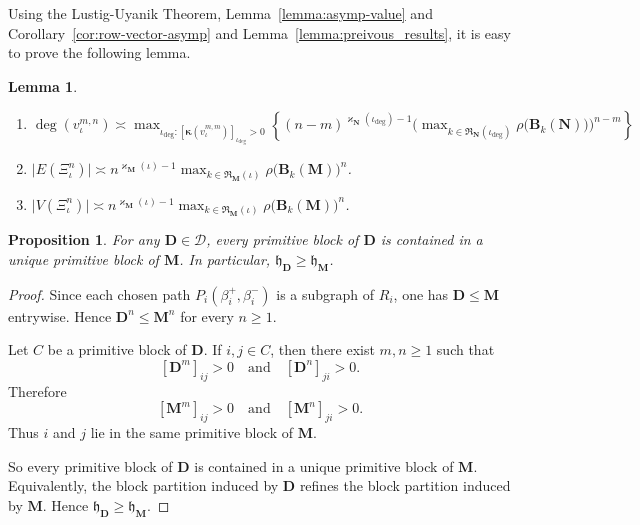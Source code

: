 \documentclass[12pt]{iopart}
\newtheorem{lemma}[theorem]{Lemma}
\newtheorem{proposition}[theorem]{Proposition}
\newcommand*{\bkappa}{\boldsymbol{\kappa}}
\begin{document}
Using the Lustig-Uyanik Theorem, Lemma~\ref{lemma:asymp-value} and Corollary~\ref{cor:row-vector-asymp} and Lemma~\ref{lemma:preivous_results}, 
it is easy to prove the following lemma.




\begin{lemma}\label{lem:basic-properties}$ $
\begin{enumerate}
    \item $\displaystyle
    \deg(v_\iota^{m,n})
\asymp
\max_{\iota_{\deg}:[\bkappa(v_\iota^{m,m})]_{\iota_{\deg}}>0}
\left\{
(n-m)^{\varkappa_{\mathbf N}(\iota_{\deg})-1}
\Big(
\max_{k\in\mathfrak R_{\mathbf N}(\iota_{\deg})}
\rho\big(\mathbf B_k(\mathbf N)\big)
\Big)^{n-m}
\right\}$
    \item 
    $\displaystyle
    \big|E(\Xi_{\iota}^n)\big|
    \asymp  
    n^{\varkappa_{\mathbf{M}}(\iota)-1}\max_{k\in\mathfrak{R}_{\mathbf M}(\iota)} 
    \rho \big( \mathbf{B}_k (\mathbf{M}) \big)^n
    $.
    \item 
    $\displaystyle
    \big|V(\Xi_{\iota}^n)\big|
    \asymp  
    n^{\varkappa_{\mathbf{M}}(\iota)-1}\max_{k\in\mathfrak{R}_{\mathbf M}(\iota)} 
    \rho \big( \mathbf{B}_k (\mathbf{M}) \big)^n
    $.
\end{enumerate}
\end{lemma}


\begin{proposition}\label{prop:distance-to-mass}
For any $\mathbf D \in \mathcal D$, every primitive block of $\mathbf D$ is contained in a unique primitive block of $\mathbf M$.
In particular, $\mathfrak h_{\mathbf D} \ge \mathfrak h_{\mathbf M}$.
\end{proposition}

\begin{proof}
Since each chosen path $P_i(\beta_i^+,\beta_i^-)$ is a subgraph of $R_i$, one has $\mathbf D \le \mathbf M$ entrywise.
Hence $\mathbf D^n \le \mathbf M^n$ for every $n \ge 1$.

Let $C$ be a primitive block of $\mathbf D$.
If $i,j \in C$, then there exist $m,n \ge 1$ such that
\[
[\mathbf D^m]_{ij} > 0
\quad \text{and} \quad
[\mathbf D^n]_{ji} > 0.
\]
Therefore
\[
[\mathbf M^m]_{ij} > 0
\quad \text{and} \quad
[\mathbf M^n]_{ji} > 0.
\]
Thus $i$ and $j$ lie in the same primitive block of $\mathbf M$.


So every primitive block of $\mathbf D$ is contained in a unique primitive block of $\mathbf M$.
Equivalently, the block partition induced by $\mathbf D$ refines the block partition induced by $\mathbf M$.
{ 
Hence $\mathfrak h_{\mathbf D} \ge \mathfrak h_{\mathbf M}$.}
\end{proof}
\end{document}
